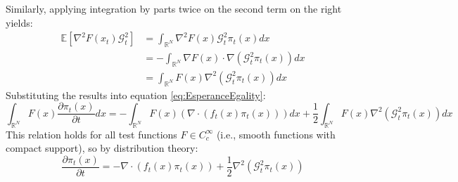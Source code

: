 \documentclass[a4paper,10pt]{article}
\theoremstyle{definition} %
\theoremstyle{definition} %
\theoremstyle{definition} %
\theoremstyle{definition} %
\newcommand{\0}{\boldsymbol{0}}
\begin{document}
Similarly, applying integration by parts twice on the second term on the right yields:
\begin{align*}
    \mathbb{E}[\nabla^2 F(x_t) \mathcal{G}_t^2] &= \int_{\mathbb{R}^N } \nabla^2 F(x) \mathcal{G}_t^2 \pi_t(x) dx \\
    &= -\int_{\mathbb{R}^N} \nabla F(x) \cdot \nabla(\mathcal{G}_t^2\pi_t(x)) dx \\
    &= \int_{\mathbb{R}^N} F(x) \nabla^2(\mathcal{G}_t^2 \pi_t(x)) dx
\end{align*}
Substituting the results into equation \cref{eq:EsperanceEgality}:
\[
\int_{\mathbb{R}^N}F(x)\frac{\partial\pi_t(x)}{\partial t} dx = - \int_{\mathbb{R}^N}F(x) (\nabla \cdot (f_t(x)\pi_t(x))) dx + \frac{1}{2}\int_{\mathbb{R}^N } F(x) \nabla^2(\mathcal{G}_t^2 \pi_t(x)) dx
\]
This relation holds for all test functions \( F \in C_c^{\infty} \) (i.e., smooth functions with compact support), so by distribution theory:
\[
\frac{\partial\pi_t(x)}{\partial t} = -\nabla \cdot (f_t(x)\pi_t(x)) + \frac{1}{2}\nabla^2(\mathcal{G}_t^2 \pi_t(x))
\]
\end{document}
